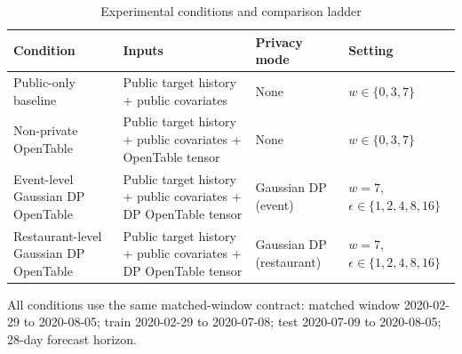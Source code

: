 \begin{table}[!htbp]
\centering
\footnotesize
\begin{threeparttable}
\caption{Experimental conditions and comparison ladder}
\label{tab:experimental_conditions}
\begin{tabularx}{\textwidth}{>{\raggedright\arraybackslash}p{}>{\raggedright\arraybackslash}X>{\raggedright\arraybackslash}p{}>{\raggedright\arraybackslash}p{}}
\toprule
Condition & Inputs & Privacy mode & Setting \\
\midrule
Public-only baseline & Public target history + public covariates & None & $w \in \{0,3,7\}$ \\
Non-private OpenTable & Public target history + public covariates + OpenTable tensor & None & $w \in \{0,3,7\}$ \\
Event-level Gaussian DP OpenTable & Public target history + public covariates + DP OpenTable tensor & Gaussian DP (event) & $w=7$, $\epsilon \in \{1,2,4,8,16\}$ \\
Restaurant-level Gaussian DP OpenTable & Public target history + public covariates + DP OpenTable tensor & Gaussian DP (restaurant) & $w=7$, $\epsilon \in \{1,2,4,8,16\}$ \\
\bottomrule
\end{tabularx}
\begin{tablenotes}[flushleft]
\footnotesize
\item All conditions use the same matched-window contract: matched window 2020-02-29 to 2020-08-05; train 2020-02-29 to 2020-07-08; test 2020-07-09 to 2020-08-05; 28-day forecast horizon.
\end{tablenotes}
\end{threeparttable}
\end{table}
